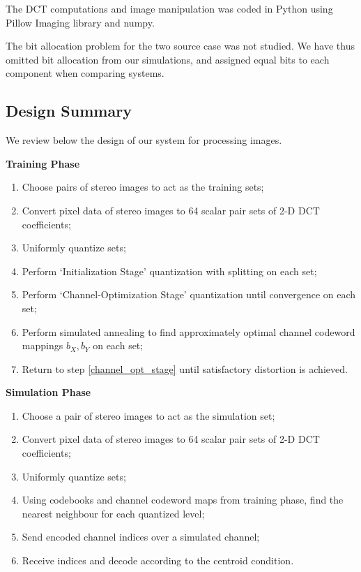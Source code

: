 The DCT computations and image manipulation was coded in Python using Pillow Imaging library and numpy.

The bit allocation problem for the two source case was not studied. We have thus omitted bit allocation from our simulations, and assigned equal bits to each component when comparing systems.


\subsection{Design Summary}
We review below the design of our system for processing images.

\medskip
{\noindent \bf Training Phase}
\begin{enumerate}
    \item Choose pairs of stereo images to act as the training sets;
    \item Convert pixel data of stereo images to 64 scalar pair sets of 2-D DCT coefficients;
    \item Uniformly quantize sets;
    \item Perform `Initialization Stage' quantization with splitting on each set;
    \item Perform `Channel-Optimization Stage' quantization until convergence on each set;
    \item Perform simulated annealing to find approximately optimal channel codeword mappings $b_X, b_Y$ on each set;
    \item Return to step \ref{channel_opt_stage} until satisfactory distortion is achieved.
\end{enumerate}
\medskip
{\noindent \bf Simulation Phase}
\begin{enumerate}
    \item Choose a pair of stereo images to act as the simulation set;
    \item Convert pixel data of stereo images to 64 scalar pair sets of 2-D DCT coefficients;
    \item Uniformly quantize sets;
    \item Using codebooks and channel codeword maps from training phase, find the nearest neighbour for each quantized level;
    \item Send encoded channel indices over a simulated channel;
    \item Receive indices and decode according to the centroid condition.
\end{enumerate}

